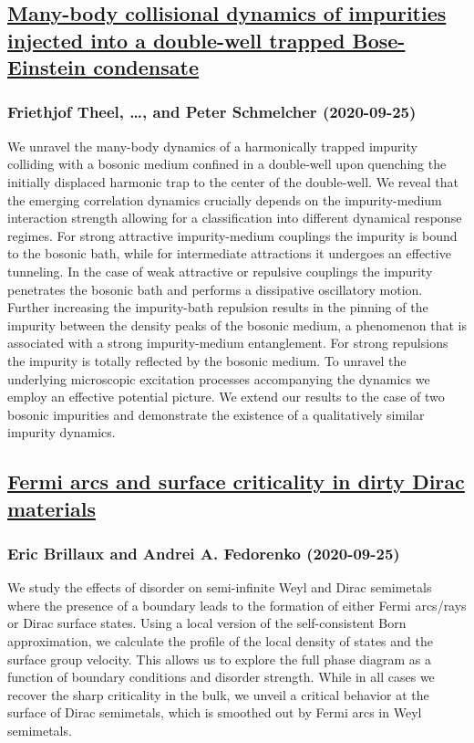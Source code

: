 \subsection*{\href{http://arxiv.org/abs/2009.12147v1}{Many-body collisional dynamics of impurities injected into a double-well  trapped Bose-Einstein condensate}}
\subsubsection*{Friethjof Theel, \dots, and Peter Schmelcher (2020-09-25)}
We unravel the many-body dynamics of a harmonically trapped impurity
colliding with a bosonic medium confined in a double-well upon quenching the
initially displaced harmonic trap to the center of the double-well. We reveal
that the emerging correlation dynamics crucially depends on the impurity-medium
interaction strength allowing for a classification into different dynamical
response regimes. For strong attractive impurity-medium couplings the impurity
is bound to the bosonic bath, while for intermediate attractions it undergoes
an effective tunneling. In the case of weak attractive or repulsive couplings
the impurity penetrates the bosonic bath and performs a dissipative oscillatory
motion. Further increasing the impurity-bath repulsion results in the pinning
of the impurity between the density peaks of the bosonic medium, a phenomenon
that is associated with a strong impurity-medium entanglement. For strong
repulsions the impurity is totally reflected by the bosonic medium. To unravel
the underlying microscopic excitation processes accompanying the dynamics we
employ an effective potential picture. We extend our results to the case of two
bosonic impurities and demonstrate the existence of a qualitatively similar
impurity dynamics.

\subsection*{\href{http://arxiv.org/abs/2009.12138v2}{Fermi arcs and surface criticality in dirty Dirac materials}}
\subsubsection*{Eric Brillaux and Andrei A. Fedorenko (2020-09-25)}
We study the effects of disorder on semi-infinite Weyl and Dirac semimetals
where the presence of a boundary leads to the formation of either Fermi
arcs/rays or Dirac surface states. Using a local version of the self-consistent
Born approximation, we calculate the profile of the local density of states and
the surface group velocity. This allows us to explore the full phase diagram as
a function of boundary conditions and disorder strength. While in all cases we
recover the sharp criticality in the bulk, we unveil a critical behavior at the
surface of Dirac semimetals, which is smoothed out by Fermi arcs in Weyl
semimetals.

